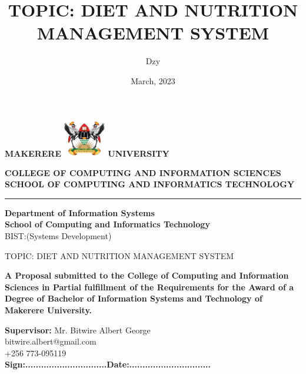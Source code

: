 \documentclass{article}
\begin{document}
\title{\textbf{TOPIC:  DIET AND NUTRITION MANAGEMENT SYSTEM} }
\author{Dzy}
\date{March, 2023}
\begin{center}

    \textbf{\Huge{MAKERERE}} \includegraphics[width=70px]{images/muk_logo.png} \textbf{\Huge{UNIVERSITY}}


    \begin{center}
        \large{\textbf{COLLEGE OF COMPUTING AND INFORMATION SCIENCES\\ SCHOOL OF COMPUTING AND INFORMATICS TECHNOLOGY}}

    \end{center}

    \hrule

    \vspace{20px}


    \vspace{-9pt}

    \begin{center}
        \textbf{Department of Information Systems}\\
        \textbf{School of Computing and Informatics Technology}
        \\ BIST:(Systems Development)
    \end{center}
    \vspace{20px}

    {\LARGE TOPIC:  DIET AND NUTRITION MANAGEMENT SYSTEM}\
    \vspace{5px}

    \begin{center}
        \textbf{A Proposal submitted to the College of Computing and Information Sciences in Partial fulfillment of the Requirements for the Award of a Degree of Bachelor of Information Systems and Technology of Makerere University.}
    \end{center}

    \vspace{3pt}
    \textbf{Supervisor:} Mr. Bitwire Albert George \\
    bitwire.albert@gmail.com \\ +256 773-095119 \\
    \vspace{25pt}
    \textbf{
        Sign:...............................\hspace{40pt}Date:...............................} \\
    \vspace{25pt}


\end{center}
\end{document}
